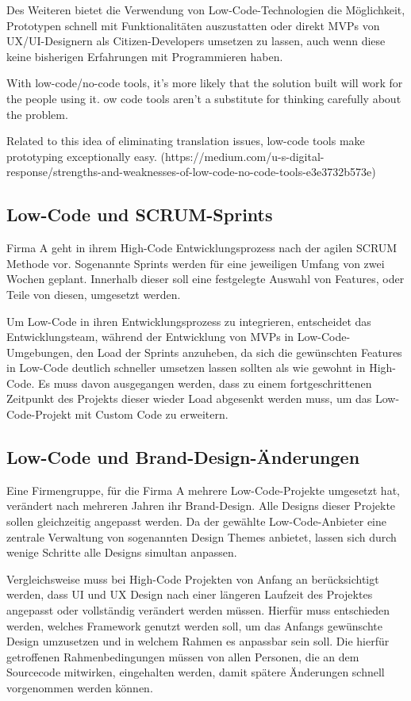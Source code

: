 \documentclass[acmtog, language=ngerman]{acmart}
\begin{document}
Des Weiteren bietet die Verwendung von Low-Code-Technologien die Möglichkeit, Prototypen schnell mit Funktionalitäten auszustatten oder direkt MVPs von UX/UI-Designern als Citizen-Developers umsetzen zu lassen, auch wenn diese keine bisherigen Erfahrungen mit Programmieren haben. 

With low-code/no-code tools, it’s more likely that the solution built will work for the people using it. 
ow code tools aren’t a substitute for thinking carefully about the problem.

Related to this idea of eliminating translation issues, low-code tools make prototyping exceptionally easy.
(https://medium.com/u-s-digital-response/strengths-and-weaknesses-of-low-code-no-code-tools-e3e3732b573e)


\subsection{Low-Code und SCRUM-Sprints}

Firma A geht in ihrem High-Code Entwicklungsprozess nach der agilen SCRUM Methode vor. Sogenannte Sprints werden für eine jeweiligen Umfang von zwei Wochen geplant. Innerhalb dieser soll eine festgelegte Auswahl von Features, oder Teile von diesen, umgesetzt werden.

Um Low-Code in ihren Entwicklungsprozess zu integrieren, entscheidet das Entwicklungsteam, während der Entwicklung von MVPs in Low-Code-Umgebungen, den Load der Sprints anzuheben, da sich die gewünschten Features in Low-Code deutlich schneller umsetzen lassen sollten als wie gewohnt in High-Code. Es muss davon ausgegangen werden, dass zu einem fortgeschrittenen Zeitpunkt des Projekts dieser wieder Load abgesenkt werden muss, um das Low-Code-Projekt mit Custom Code zu erweitern.

\subsection{Low-Code und Brand-Design-Änderungen}

Eine Firmengruppe, für die Firma A mehrere Low-Code-Projekte umgesetzt hat, verändert nach mehreren Jahren ihr Brand-Design. Alle Designs dieser Projekte sollen gleichzeitig angepasst werden. Da der gewählte Low-Code-Anbieter eine zentrale Verwaltung von sogenannten Design Themes anbietet, lassen sich durch wenige Schritte alle Designs simultan anpassen.

Vergleichsweise muss bei High-Code Projekten von Anfang an berücksichtigt werden, dass UI und UX Design nach einer längeren Laufzeit des Projektes angepasst oder vollständig verändert werden müssen. Hierfür muss entschieden werden, welches Framework genutzt werden soll, um das Anfangs gewünschte Design umzusetzen und in welchem Rahmen es anpassbar sein soll. Die hierfür getroffenen Rahmenbedingungen müssen von allen Personen, die an dem Sourcecode mitwirken, eingehalten werden, damit spätere Änderungen schnell vorgenommen werden können. 
\end{document}
